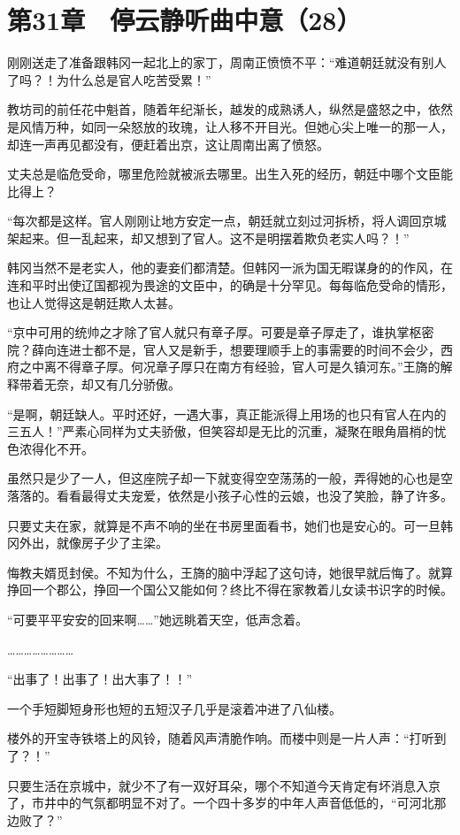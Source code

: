 \section{第31章　停云静听曲中意（28）}

刚刚送走了准备跟韩冈一起北上的家丁，周南正愤愤不平：“难道朝廷就没有别人了吗？！为什么总是官人吃苦受累！”

教坊司的前任花中魁首，随着年纪渐长，越发的成熟诱人，纵然是盛怒之中，依然是风情万种，如同一朵怒放的玫瑰，让人移不开目光。但她心尖上唯一的那一人，却连一声再见都没有，便赶着出京，这让周南出离了愤怒。

丈夫总是临危受命，哪里危险就被派去哪里。出生入死的经历，朝廷中哪个文臣能比得上？

“每次都是这样。官人刚刚让地方安定一点，朝廷就立刻过河拆桥，将人调回京城架起来。但一乱起来，却又想到了官人。这不是明摆着欺负老实人吗？！”

韩冈当然不是老实人，他的妻妾们都清楚。但韩冈一派为国无暇谋身的的作风，在连和平时出使辽国都视为畏途的文臣中，的确是十分罕见。每每临危受命的情形，也让人觉得这是朝廷欺人太甚。

“京中可用的统帅之才除了官人就只有章子厚。可要是章子厚走了，谁执掌枢密院？薛向连进士都不是，官人又是新手，想要理顺手上的事需要的时间不会少，西府之中离不得章子厚。何况章子厚只在南方有经验，官人可是久镇河东。”王旖的解释带着无奈，却又有几分骄傲。

“是啊，朝廷缺人。平时还好，一遇大事，真正能派得上用场的也只有官人在内的三五人！”严素心同样为丈夫骄傲，但笑容却是无比的沉重，凝聚在眼角眉梢的忧色浓得化不开。

虽然只是少了一人，但这座院子却一下就变得空空荡荡的一般，弄得她的心也是空落落的。看看最得丈夫宠爱，依然是小孩子心性的云娘，也没了笑脸，静了许多。

只要丈夫在家，就算是不声不响的坐在书房里面看书，她们也是安心的。可一旦韩冈外出，就像房子少了主梁。

悔教夫婿觅封侯。不知为什么，王旖的脑中浮起了这句诗，她很早就后悔了。就算挣回一个郡公，挣回一个国公又能如何？终比不得在家教着儿女读书识字的时候。

“可要平平安安的回来啊……”她远眺着天空，低声念着。

……………………

“出事了！出事了！出大事了！！”

一个手短脚短身形也短的五短汉子几乎是滚着冲进了八仙楼。

楼外的开宝寺铁塔上的风铃，随着风声清脆作响。而楼中则是一片人声：“打听到了？！”

只要生活在京城中，就少不了有一双好耳朵，哪个不知道今天肯定有坏消息入京了，市井中的气氛都明显不对了。一个四十多岁的中年人声音低低的，“可河北那边败了？”

